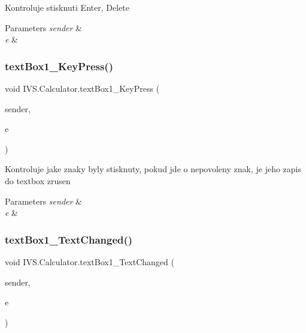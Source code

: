 Kontroluje stisknuti Enter, Delete 


\begin{DoxyParams}{Parameters}
{\em sender} & \\
\hline
{\em e} & \\
\hline
\end{DoxyParams}
\mbox{\label{class_i_v_s_1_1_calculator_a61fcf6cf05550befa610468b0434e99e}} 
\subsubsection{\texorpdfstring{text\+Box1\+\_\+\+Key\+Press()}{textBox1\_KeyPress()}}
{\footnotesize\ttfamily void I\+V\+S.\+Calculator.\+text\+Box1\+\_\+\+Key\+Press (\begin{DoxyParamCaption}\item[{object}]{sender,  }\item[{Key\+Press\+Event\+Args}]{e }\end{DoxyParamCaption})\hspace{0.3cm}{\ttfamily [protected]}}



Kontroluje jake znaky byly stisknuty, pokud jde o nepovoleny znak, je jeho zapis do textbox zrusen 


\begin{DoxyParams}{Parameters}
{\em sender} & \\
\hline
{\em e} & \\
\hline
\end{DoxyParams}
\mbox{\label{class_i_v_s_1_1_calculator_a5b2424094c9a7228f4b71fd9e27a79ca}} 
\subsubsection{\texorpdfstring{text\+Box1\+\_\+\+Text\+Changed()}{textBox1\_TextChanged()}}
{\footnotesize\ttfamily void I\+V\+S.\+Calculator.\+text\+Box1\+\_\+\+Text\+Changed (\begin{DoxyParamCaption}\item[{object}]{sender,  }\item[{Event\+Args}]{e }\end{DoxyParamCaption})\hspace{0.3cm}{\ttfamily [protected]}}



